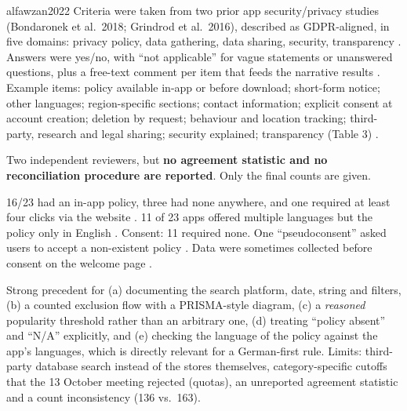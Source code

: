 \begin{papercard}{alfawzan2022}
 Criteria were taken from two prior app security/privacy studies (Bondaronek et al.\ 2018; Grindrod et al.\ 2016), described as GDPR-aligned, in five domains: privacy policy, data gathering, data sharing, security, transparency . Answers were yes/no, with ``not applicable'' for vague statements or unanswered questions, plus a free-text comment per item that feeds the narrative results . Example items: policy available in-app or before download; short-form notice; other languages; region-specific sections; contact information; explicit consent at account creation; deletion by request; behaviour and location tracking; third-party, research and legal sharing; security explained; transparency (Table 3) .

 Two independent reviewers, but \textbf{no agreement statistic and no reconciliation procedure are reported}. Only the final counts are given.

 16/23 had an in-app policy, three had none anywhere, and one required at least four clicks via the website . 11 of 23 apps offered multiple languages but the policy only in English . Consent: 11 required none. One ``pseudoconsent'' asked users to accept a non-existent policy . Data were sometimes collected before consent on the welcome page .

 Strong precedent for (a) documenting the search platform, date, string and filters, (b) a counted exclusion flow with a PRISMA-style diagram, (c) a \emph{reasoned} popularity threshold rather than an arbitrary one, (d) treating ``policy absent'' and ``N/A'' explicitly, and (e) checking the language of the policy against the app's languages, which is directly relevant for a German-first rule. Limits: third-party database search instead of the stores themselves, category-specific cutoffs that the 13 October meeting rejected (quotas), an unreported agreement statistic and a count inconsistency (136 vs.\ 163).
\end{papercard}
